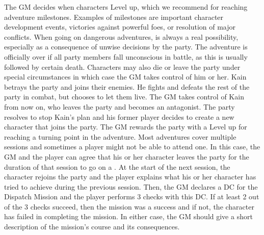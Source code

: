The GM decides when characters Level up, which we recommend for reaching adventure milestones.
Examples of milestones are important character development events, victories against powerful foes, or resolution of major conflicts. 
When going on dangerous adventures,  is always a real possibility, especially as a consequence of unwise decisions by the party. 
The adventure is officially over if all party members fall unconscious in battle, as this is usually followed by certain death. 
Characters may also die or leave the party under special circumstances in which case the GM takes control of him or her.
%
\ofpar
%
{
	Kain betrays the party and joins their enemies. 
	He fights and defeats the rest of the party in combat, but chooses to let them live.
	The GM takes control of Kain from now on, who leaves the party and becomes an antagonist.
	The party resolves to stop Kain's plan and his former player decides to create a new character that joins the party. 
	The GM rewards the party with a Level up for reaching a turning point in the adventure.
}
%
\vfill
%
Most adventures cover multiple sessions and sometimes a player might not be able to attend one.
In this case, the GM and the player can agree that his or her character leaves the party for the duration of that session to go on a .
At the start of the next session, the character rejoins the party and the player explains what his or her character has tried to achieve during the previous session.
Then, the GM declares a DC for the Dispatch Mission and the player performs 3 checks with this DC.
If at least 2 out of the 3 checks succeed, then the mission was a success and if not, the character has failed in completing the mission.
In either case, the GM should give a short description of the mission's course and its consequences.
%
\clearpage
